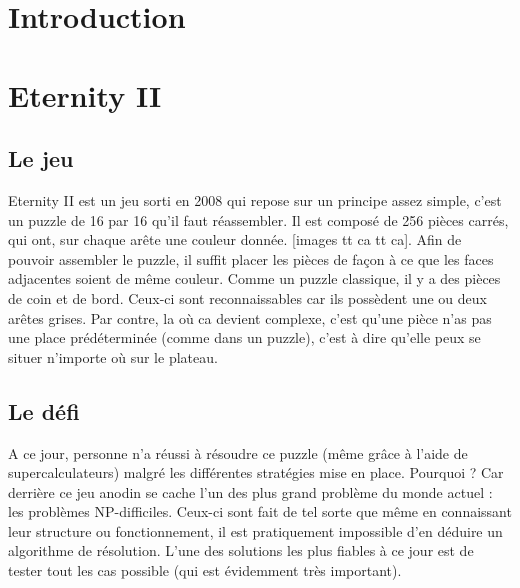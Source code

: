 \documentclass{article}
\begin{document}
	
	\renewcommand{\labelitemi}{$\bullet$}
	\renewcommand{\labelitemii}{$\cdot$}
	\renewcommand{\labelitemiii}{$\diamond$}
	\renewcommand{\labelitemiv}{$\ast$}
	
	\newcommand{\HRule}{\rule{\linewidth}{0.5mm}}
	
	
	
	
	\section{Introduction}
	
	\section{Eternity II}
	\subsection{Le jeu}
	
	Eternity II est un jeu sorti en 2008 qui repose sur un principe assez simple, c'est un puzzle de 16 par 16 qu'il faut réassembler. Il est composé de 256 pièces carrés, qui ont, sur chaque arête une couleur donnée. [images tt ca tt ca]. Afin de pouvoir assembler le puzzle, il suffit placer les pièces de façon à ce que les faces adjacentes soient de même couleur. Comme un puzzle classique, il y a des pièces de coin et de bord. Ceux-ci sont reconnaissables car ils possèdent une ou deux arêtes grises. Par contre, la où ca devient complexe, c'est qu'une pièce n'as pas une place prédéterminée (comme dans un puzzle), c'est à dire qu'elle peux se situer n'importe où sur le plateau. 
	
	\subsection{Le défi}
	
	A ce jour, personne n'a réussi à résoudre ce puzzle (même grâce à l'aide de supercalculateurs) malgré les différentes stratégies mise en place. Pourquoi ? Car derrière ce jeu anodin se cache l'un des plus grand problème du monde actuel : les problèmes NP-difficiles. Ceux-ci sont fait de tel sorte que même en connaissant leur structure ou fonctionnement, il est pratiquement impossible d'en déduire un algorithme de résolution. L'une des solutions les plus fiables à ce jour est de tester tout les cas possible (qui est évidemment très important).
	
\end{document}

